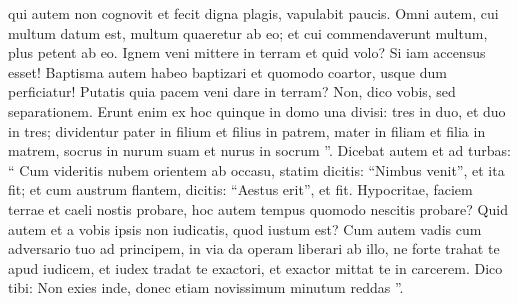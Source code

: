 \begin{biblechapter}
\begin{biblechapter}
\begin{biblechapter}
\begin{biblechapter}
\begin{biblechapter}
\begin{biblechapter}
\begin{biblechapter}
\begin{biblechapter}
\begin{biblechapter}
\begin{biblechapter}
\begin{biblechapter}
\begin{biblechapter}
\verse qui autem non cognovit et fecit digna plagis, vapulabit paucis. Omni autem, cui multum datum est, multum quaeretur ab eo; et cui commendaverunt multum, plus petent ab eo.
 \verse Ignem veni mittere in terram et quid volo? Si iam accensus esset! 
\verse Baptisma autem habeo baptizari et quomodo coartor, usque dum perficiatur! 
\verse Putatis quia pacem veni dare in terram? Non, dico vobis, sed separationem. 
 \verse Erunt enim ex hoc quinque in domo una divisi: tres in duo, et duo in tres; 
 \verse dividentur pater in filium et filius in patrem, mater in filiam et filia in matrem, socrus in nurum suam et nurus in socrum ”.
 \verse Dicebat autem et ad turbas: “ Cum videritis nubem orientem ab occasu, statim dicitis: “Nimbus venit”, et ita fit; 
\verse et cum austrum flantem, dicitis: “Aestus erit”, et fit. 
\verse Hypocritae, faciem terrae et caeli nostis probare, hoc autem tempus quomodo nescitis probare? 
\verse Quid autem et a vobis ipsis non iudicatis, quod iustum est?
 \verse Cum autem vadis cum adversario tuo ad principem, in via da operam liberari ab illo, ne forte trahat te apud iudicem, et iudex tradat te exactori, et exactor mittat te in carcerem. 
\verse Dico tibi: Non exies inde, donec etiam novissimum minutum reddas ”.
 

\end{biblechapter}
\end{biblechapter}
\end{biblechapter}
\end{biblechapter}
\end{biblechapter}
\end{biblechapter}
\end{biblechapter}
\end{biblechapter}
\end{biblechapter}
\end{biblechapter}
\end{biblechapter}
\end{biblechapter}
